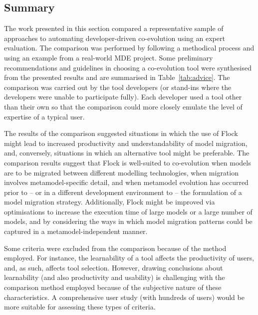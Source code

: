\subsection{Summary}
The work presented in this section compared a representative sample of approaches to automating developer-driven co-evolution using an expert evaluation. The comparison was performed by following a methodical process and using an example from a real-world MDE project. Some preliminary recommendations and guidelines in choosing a co-evolution tool were synthesised from the presented results and are summarised in Table~\ref{tab:advice}. The comparison was carried out by the tool developers (or stand-ins where the developers were unable to participate fully). Each developer used a tool other than their own so that the comparison could more closely emulate the level of expertise of a typical user.

The results of the comparison suggested situations in which the use of Flock might lead to increased productivity and understandability of model migration, and, conversely, situations in which an alternative tool might be preferable. The comparison results suggest that Flock is well-suited to co-evolution when models are to be migrated between different modelling technologies, when migration involves metamodel-specific detail, and when metamodel evolution has occurred prior to -- or in a different development environment to -- the formulation of a model migration strategy. Additionally, Flock might be improved via optimisations to increase the execution time of large models or a large number of models, and by considering the ways in which model migration patterns could be captured in a metamodel-independent manner.

Some criteria were excluded from the comparison because of the method employed. For instance, the learnability of a tool affects the productivity of users, and, as such, affects tool selection. However, drawing conclusions about learnability (and also productivity and usability) is challenging with the comparison method employed because of the subjective nature of these characteristics. A comprehensive user study (with hundreds of users) would be more suitable for assessing these types of criteria.
